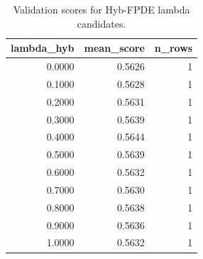 \begin{table}[t]
\caption{Validation scores for Hyb-FPDE lambda candidates.}
\label{tab:lambda_distribution_computed}
\centering
\begin{tabular}{rrr}
\toprule
lambda\_hyb & mean\_score & n\_rows \\
\midrule
0.0000 & 0.5626 & 1 \\
0.1000 & 0.5628 & 1 \\
0.2000 & 0.5631 & 1 \\
0.3000 & 0.5639 & 1 \\
0.4000 & 0.5644 & 1 \\
0.5000 & 0.5639 & 1 \\
0.6000 & 0.5632 & 1 \\
0.7000 & 0.5630 & 1 \\
0.8000 & 0.5638 & 1 \\
0.9000 & 0.5636 & 1 \\
1.0000 & 0.5632 & 1 \\
\bottomrule
\end{tabular}

\end{table}
